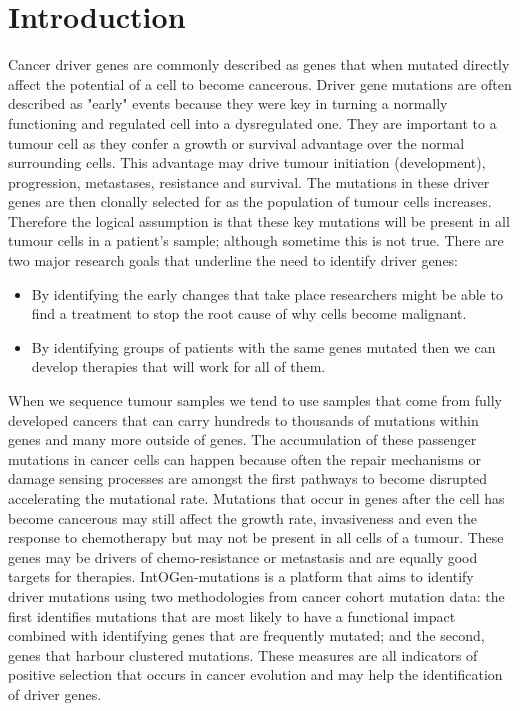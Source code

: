 \section{Introduction}
Cancer driver genes are commonly described as genes that when mutated directly affect
the potential of a cell to become cancerous. Driver gene mutations are often described
as "early" events because they were key in turning a normally functioning and regulated
cell into a dysregulated one. They are important to a tumour cell as they confer a growth
or survival advantage over the normal surrounding cells. This advantage may drive tumour
initiation (development), progression, metastases, resistance and survival. The mutations
in these driver genes are then clonally selected for as the population of tumour cells
increases. Therefore the logical assumption is that these key mutations will be present
in all tumour cells in a patient's sample; although sometime this is not true.
\vspace{4 mm}
There are two major research goals that underline the need to identify driver genes:
\begin{itemize}
\item By identifying the early changes that take place researchers might be able
to find a treatment to stop the root cause of why cells become malignant. 
\item By identifying groups of patients with the same genes mutated then we can
develop therapies that will work for all of them.
\end{itemize}
\vspace{4 mm}
When we sequence tumour samples we tend to use samples that come from fully developed
cancers that can carry hundreds to thousands of mutations within genes and many more outside
of genes. The accumulation of these passenger mutations in cancer cells can happen
because often the repair mechanisms or damage sensing processes are amongst the first
pathways to become disrupted accelerating the mutational rate. Mutations that occur in
genes after the cell has become cancerous may still affect the growth rate, invasiveness
and even the response to chemotherapy but may not be present in all cells of a tumour.
These genes may be drivers of chemo-resistance or metastasis and are equally good targets
for therapies.
\vspace{4 mm}
IntOGen-mutations is a platform that aims to identify driver mutations using two
methodologies from cancer cohort mutation data: the first identifies mutations that
are most likely to have a functional impact combined with identifying  genes that are
frequently mutated; and the second, genes that harbour clustered mutations. These measures
are all indicators of positive selection that occurs in cancer evolution and may help
the identification of driver genes.

